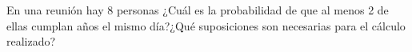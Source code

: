 \item En una reunión hay 8 personas ¿Cuál es la probabilidad de que al menos 2 de ellas cumplan años el mismo día?¿Qué suposiciones son necesarias para el cálculo realizado?